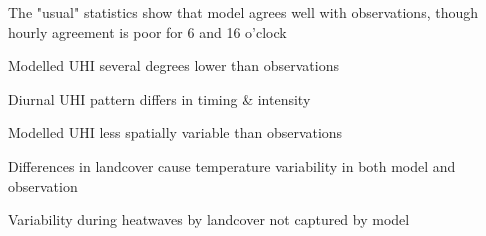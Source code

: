 \documentclass[draft,linenumbers]{agujournal}
\begin{document}





\begin{keypoints}

\item The "usual" statistics show that model agrees well with observations, though hourly agreement is poor for 6 and 16 o'clock
\item Modelled UHI several degrees lower than observations
\item Diurnal UHI pattern differs in timing \& intensity
\item Modelled UHI less spatially variable than observations 
\item Differences in landcover cause temperature variability in both model and observation
\item Variability during heatwaves by landcover not captured by model

\end{keypoints}

%
%
\end{document}
